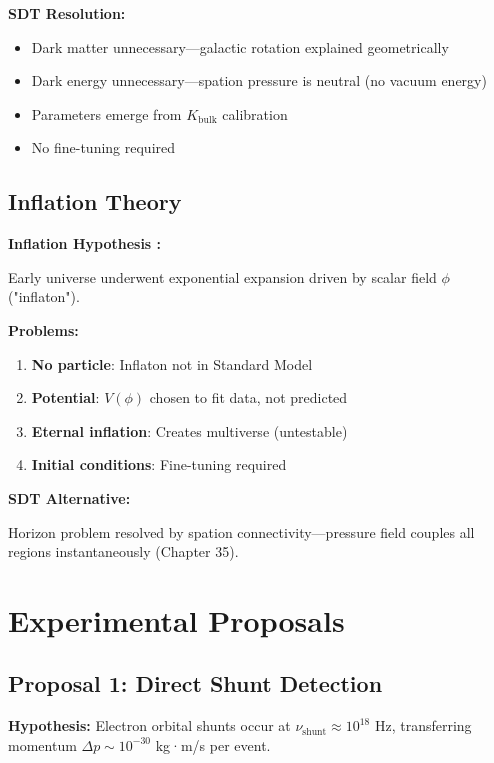 \textbf{SDT Resolution:}

\begin{itemize}
\item Dark matter unnecessary—galactic rotation explained geometrically
\item Dark energy unnecessary—spation pressure is neutral (no vacuum energy)
\item Parameters emerge from $K_{\text{bulk}}$ calibration
\item No fine-tuning required
\end{itemize}

\subsection{Inflation Theory}

\textbf{Inflation Hypothesis \cite{guth1981inflationary}:}

Early universe underwent exponential expansion driven by scalar field $\phi$ ("inflaton").

\textbf{Problems:}

\begin{enumerate}
\item \textbf{No particle}: Inflaton not in Standard Model
\item \textbf{Potential}: $V(\phi)$ chosen to fit data, not predicted
\item \textbf{Eternal inflation}: Creates multiverse (untestable)
\item \textbf{Initial conditions}: Fine-tuning required
\end{enumerate}

\textbf{SDT Alternative:}

Horizon problem resolved by spation connectivity—pressure field couples all regions instantaneously (Chapter 35).

\section{Experimental Proposals}

\subsection{Proposal 1: Direct Shunt Detection}

\textbf{Hypothesis:} Electron orbital shunts occur at $\nu_{\text{shunt}} \approx 10^{18}$ Hz, transferring momentum $\Delta p \sim 10^{-30}$ kg·m/s per event.

